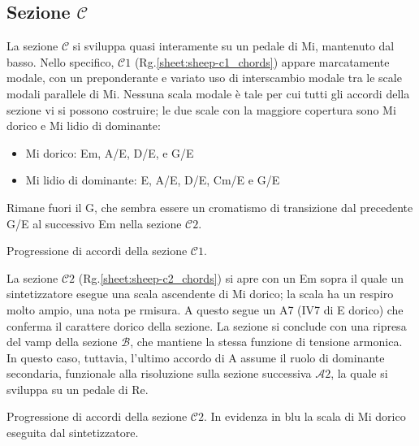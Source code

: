 \documentclass[class=book, crop=false, oneside, 12pt]{standalone}
\begin{document}
    \subsection*{Sezione \(\mathcal{C}\)}
    La sezione \(\mathcal{C}\) si sviluppa quasi interamente su un pedale di Mi, mantenuto dal basso. Nello specifico, \(\mathcal{C}1\) (Rg.\ref{sheet:sheep-c1_chords}) appare marcatamente modale, con un preponderante e variato uso di interscambio modale tra le scale modali parallele di Mi. Nessuna scala modale è tale per cui tutti gli accordi della sezione vi si possono costruire; le due scale con la maggiore copertura sono Mi dorico e Mi lidio di dominante:
    \begin{itemize}
        \item Mi dorico: Em, A/E, D/E, e G/E
        \item Mi lidio di dominante: E, A/E, D/E, C\sharp m/E e G/E
    \end{itemize}

    Rimane fuori il G\flat, che sembra essere un cromatismo di transizione dal precedente G/E al successivo Em nella sezione \(\mathcal{C}2\).
    
    \begin{sheet}[htbp]
        \centering
        \caption[Progressione di accordi della sezione \(\mathcal{C}1\).]{Progressione di accordi della sezione \(\mathcal{C}1\).}
        \label{sheet:sheep-c1_chords}
    \end{sheet}

    La sezione \(\mathcal{C}2\) (Rg.\ref{sheet:sheep-c2_chords})  si apre con un Em  sopra il quale un sintetizzatore esegue una scala ascendente di Mi dorico; la scala ha un respiro molto ampio, una nota pe rmisura. A questo segue un A7 (IV7 di E dorico) che conferma il carattere dorico della sezione. La sezione si conclude con una ripresa del vamp della sezione \(\mathcal{B}\), che mantiene la stessa funzione di tensione armonica. In questo caso, tuttavia, l'ultimo accordo di A assume il ruolo di dominante secondaria, funzionale alla risoluzione sulla sezione successiva \(\mathcal{A}2\), la quale si sviluppa su un pedale di Re.

    \begin{sheet}[htbp]
        \centering
        \caption[Progressione di accordi della sezione \(\mathcal{C}2\).]{Progressione di accordi della sezione \(\mathcal{C}2\). In evidenza in blu la scala di Mi dorico eseguita dal sintetizzatore.}
        \label{sheet:sheep-c2_chords}
    \end{sheet}
\end{document}
